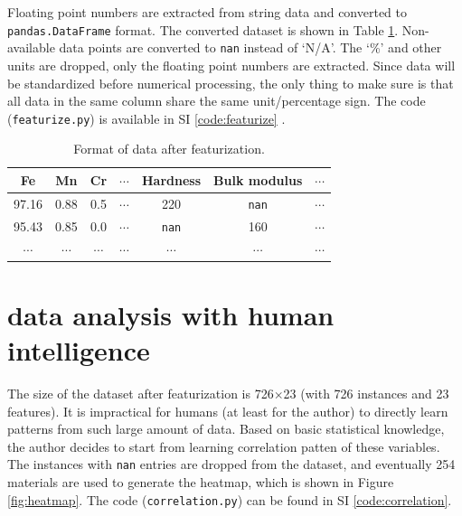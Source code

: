 \documentclass[10pt,aps,prb,amsmath,amssymb,twocolumn,letterpaper,nobalancelastpage,final,citeautoscript,floatfix,raggedbottom,superscriptaddress]{revtex4-1}
\begin{document}
Floating point numbers are extracted from string data and converted to \texttt{pandas.DataFrame} format. The converted dataset is shown in Table \ref{tab:featurization}. Non-available data points are converted to \texttt{nan} instead of `N/A'. The `\%' and other units are dropped, only the floating point numbers are extracted. Since data will be standardized before numerical processing, the only thing to make sure is that all data in the same column share the same unit/percentage sign. The code (\texttt{featurize.py}) is available in SI \ref{code:featurize} .

\vspace{-10pt}
\begin{table}[h]
\begin{ruledtabular}
\caption{Format of data after featurization.\label{tab:featurization}}\centering
\begin{tabular}{ccccccc}
\sffamily Fe & \sffamily Mn & \sffamily Cr &  \sffamily $\cdots$ &  \sffamily Hardness &  \sffamily Bulk modulus &  \sffamily $\cdots$ \\
\hline 
97.16 & 0.88 & 0.5 & $\cdots$ & 220 & \texttt{nan} & $\cdots$\\
\hline
95.43 & 0.85 & 0.0 & $\cdots$ & \texttt{nan} & 160 & $\cdots$\\
\hline
$\cdots$ & $\cdots$ & $\cdots$ & $\cdots$ & $\cdots$ & $\cdots$ & $\cdots$
\end{tabular}
\end{ruledtabular}
\end{table}


\section{data analysis with human intelligence}

The size of the dataset after featurization is 726$\times$23 (with 726 instances and 23 features). It is impractical for humans (at least for the author) to directly learn patterns from such large amount of data. Based on basic statistical knowledge, the author decides to start from learning correlation patten of these variables. The instances with \texttt{nan} entries are dropped from the dataset, and eventually 254 materials are used to generate the heatmap, which is shown in Figure \ref{fig:heatmap}. The code (\texttt{correlation.py}) can be found in SI \ref{code:correlation}.
\end{document}
